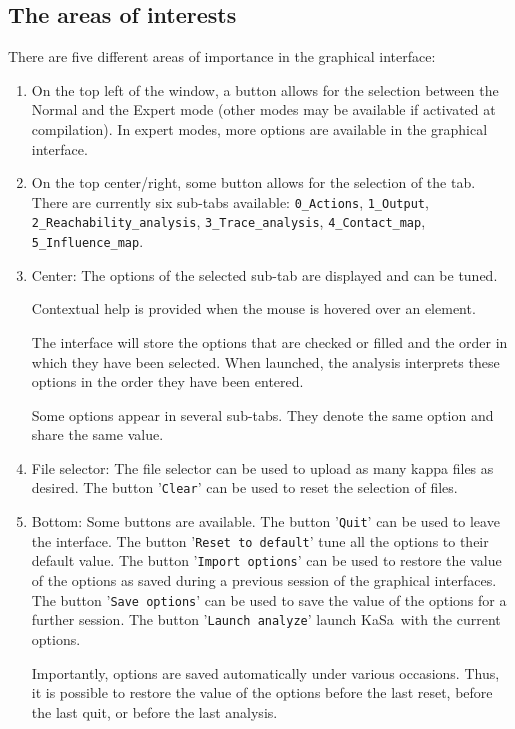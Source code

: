 \documentclass[11pt]{book}
\def\KaSa{\textsf{KaSa}}
\begin{document}
\subsection{The areas of interests}

There are five different areas of importance in the graphical interface:
\begin{enumerate}
\item On the top left of the window, a button allows for the selection between the Normal and the Expert mode (other modes may be available if activated at compilation).
In expert modes, more options are available in the graphical interface.
\item On the top center/right, some button allows for the selection of the tab. There are currently six sub-tabs available: \texttt{0\_Actions}, \texttt{1\_Output}, \texttt{2\_Reachability\_analysis}, \texttt{3\_Trace\_analysis}, \texttt{4\_Contact\_map}, \texttt{5\_Influence\_map}.

\item Center: The options of the selected sub-tab are displayed and can be tuned.

Contextual help is provided when the mouse is hovered over an element.

The interface will store the options that are checked or filled and the order in which they have been selected.
When launched, the analysis interprets these options in the order they have been entered.

Some options appear in several sub-tabs. They denote the same option and share the same value.

\item File selector: The file selector can be used to upload as many kappa files as desired. The button '\texttt{Clear}' can be used to reset the selection of files.
\item Bottom: Some buttons are available. The button '\texttt{Quit}' can be used to leave the interface. The button '\texttt{Reset to default}' tune all the options to their default value. The button '\texttt{Import options}' can be used to restore the value of the options as saved during a previous session of the graphical interfaces. The button '\texttt{Save options}' can be used to save the value of the options for a further session. The button '\texttt{Launch analyze}' launch \KaSa\ with the current options.

Importantly, options are saved automatically under various occasions. Thus, it is possible to restore the value of the options
before the last reset, before the last quit, or before the last analysis.
\end{enumerate}
\end{document}
